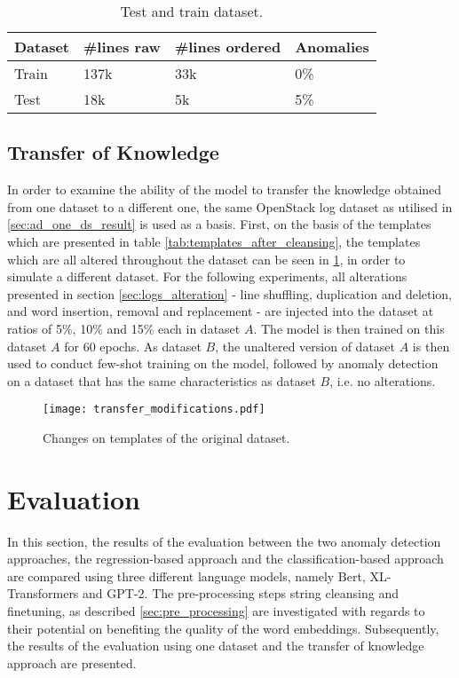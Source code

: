 \begin{table}[ht]
\centering
\begin{small}
\begin{tabular}{ p{1.3cm} p{1.8cm} p{2.3cm} p{1.7cm}}
\toprule
Dataset & \#lines raw & \#lines ordered & Anomalies\\
\midrule
Train & 137k & 33k & 0\%\\
Test & 18k & 5k & 5\%\\ 

\bottomrule
\end{tabular}
\caption{Test and train dataset.}
\label{tab:test_train_ds}
\end{small}
\end{table}



\subsection{Transfer of Knowledge \label{sec:transfer_learning_setup}}
In order to examine the ability of the model to transfer the knowledge obtained from one dataset to a different one, the same OpenStack log dataset as utilised in \ref{sec:ad_one_ds_result} is used as a basis. First, on the basis of the templates which are presented in table \ref{tab:templates_after_cleansing}, the templates which are all altered throughout the dataset can be seen in \ref{fig:transfer_modifications}, in order to simulate a different dataset. For the following experiments, all alterations presented in section \ref{sec:logs_alteration} - line shuffling, duplication and deletion, and word insertion, removal and replacement - are injected into the dataset at ratios of 5\%, 10\% and 15\% each in dataset $A$. The model is then trained on this dataset $A$ for 60 epochs. As dataset $B$, the unaltered version of dataset $A$ is then used to conduct few-shot training on the model, followed by anomaly detection on a dataset that has the same characteristics as dataset $B$, i.e. no alterations.

\begin{figure}[H]
  \centering
  \texttt{[image: transfer\_modifications.pdf]}\\
  \caption{Changes on templates of the original dataset.}
  \label{fig:transfer_modifications}
\end{figure}




\section{Evaluation\label{sec:evaluation}}
In this section, the results of the evaluation between the two anomaly detection approaches,  the regression-based approach and the classification-based approach are compared using three different language models, namely Bert, XL-Transformers and GPT-2. The pre-processing steps string cleansing and finetuning, as described \ref{sec:pre_processing} are investigated with regards to their potential on benefiting the quality of the word embeddings. Subsequently, the results of the evaluation using one dataset and the transfer of knowledge approach are presented.


